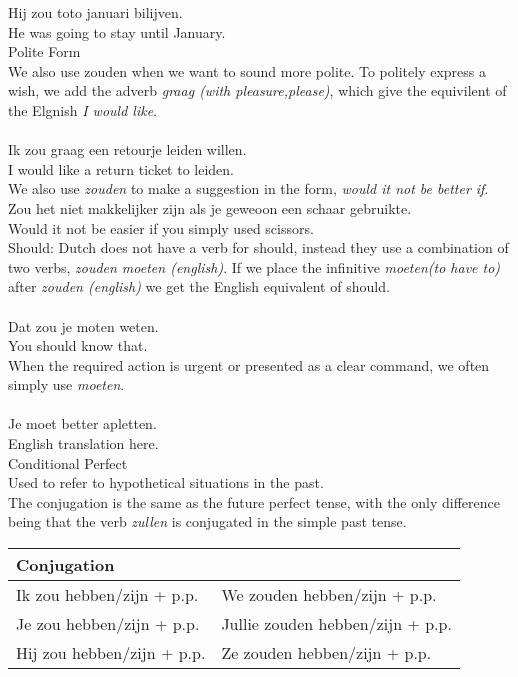 \documentclass[letterpaper,11pt]{article}
\begin{document}
Hij zou toto januari bilijven. \\
He was going to stay until January. \\
Polite Form \\
We also use zouden when we want to sound more polite. To politely express a
wish, we add the adverb \textit{graag (with pleasure,please)}, which give the
equivilent of the Elgnish \textit{I would like}. \\
 \\
Ik zou graag een retourje leiden willen. \\
I would like a return ticket to leiden. \\
We also use \textit{zouden} to make a suggestion in the form, \textit{would it
not be better if}. \\
Zou het niet makkelijker zijn als je geweoon een schaar gebruikte. \\
Would it not be easier if you simply used scissors. \\
Should: Dutch does not have a verb for should, instead they use a combination of
two verbs, \textit{zouden moeten (english)}. If we place the infinitive
\textit{moeten(to have to)} after \textit{zouden (english)} we get the English
equivalent of should. \\
 \\
Dat zou je moten weten. \\
You should know that. \\
When the required action is urgent or presented as a clear command, we often
simply use \textit{moeten}. \\
 \\
Je moet better apletten. \\
English translation here. \\
Conditional Perfect \\
Used to refer to hypothetical situations in the past. \\
The conjugation is the same as the future perfect tense, with the only
difference being that the verb \textit{zullen} is conjugated in the simple past
tense. \\
\begin{tabular}[t]{l l}
    \textbf{Conjugation} \\
    \hline
    Ik zou hebben/zijn + p.p. & We zouden hebben/zijn + p.p. \\
    Je zou hebben/zijn + p.p. & Jullie zouden hebben/zijn + p.p. \\
    Hij zou hebben/zijn + p.p. & Ze zouden hebben/zijn + p.p. \\
\end{tabular}
\end{document}
